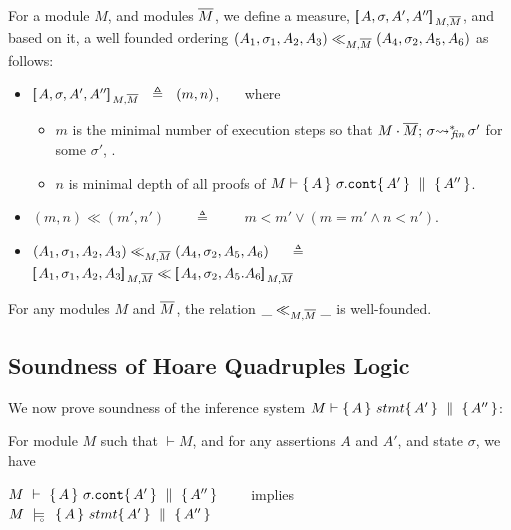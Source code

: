 {
\begin{definition}
For a module $M$, and modules $\overline{M}$,   we define a measure, $[\!\![\, A, \sigma,A',A'' ]\!\!]\,_{M,\overline{M}} $, and based on it, a well founded ordering $(A_1,\sigma_1,A_2, A_3) \ll_{M,\overline{M}}  (A_4,\sigma_2,A_5,A_6)$
as follows:
\begin{itemize}
\item
 $[\!\![\, A, \sigma,A',A'' ]\!\!]\,_{M,\overline{M}} \  \ \triangleq \ \  (m, n)$,  \ \ \  where
\begin{itemize}
\item
$m$ is the minimal number of execution steps so that $ M\cdot \overline{M};\, {\sigma} {\rightsquigarrow^*}\!\!_{\mathit{fin}}\, \sigma'$  for some $\sigma'$, .
 \item
  $n$ is minimal depth of all proofs of $M \vdash  \{\, A \, \}\ \sigma.\mbox{\normalfont{\texttt{cont}}} \{\, A' \, \} \, \,\parallel\,\, \{\, A'' \, \}  $.
\end{itemize}
 \item
 $(m,n) \ll (m',n')$\ \  \ \ $\triangleq$ \ \  \ \ $ m<m'\vee  (m=m'  \wedge n < n')   $.
\item
$(A_1,\sigma_1,A_2, A_3) \ll_{M,\overline{M}}  (A_4,\sigma_2,A_5, A_6)$  \  \  $\triangleq$ \ \ 
$\measure {A_1, \sigma_1,A_2, A_3} {M,\Mtwo}  \ll \measure {A_4, \sigma_2,A_5. A_6} {M,\Mtwo} $
\end{itemize}
\end{definition}
}


\begin{auxLemma}
\label{lemma:normal:two}
For any modules $M$ and $\overline{M}$,  the relation $\_ \ll_{M,\overline{M}}  \_$ is well-founded.
\end{auxLemma}



\subsection{ Soundness of  Hoare Quadruples Logic}
\label{sect:prove:sound:quadruples}
We now prove soundness of the inference system $M \vdash   \{\, A \, \}\ stmt \{\, A' \, \} \, \,\parallel\,\, \{\, A'' \, \} $:


\begin{theorem}
\label{t:quadruple:sound}
For module  $M$ %
such that  $\vdash M$, and for any assertions $A$ and $A'$, and state  $\sigma$, we have

\begin{center}
$M\ \vdash\   \{\, A \, \}\ \sigma.\mbox{\normalfont{\texttt{cont}}} \{\, A' \, \} \, \,\parallel\,\, \{\, A'' \, \} $ \ \ \ \ implies \ \ \ \ $M\ \models\!\!\!\!_{_{\circ}}\ \   \{\, A \, \}\ stmt \{\, A' \, \} \, \,\parallel\,\, \{\, A'' \, \} $
\end{center}

\end{theorem}


